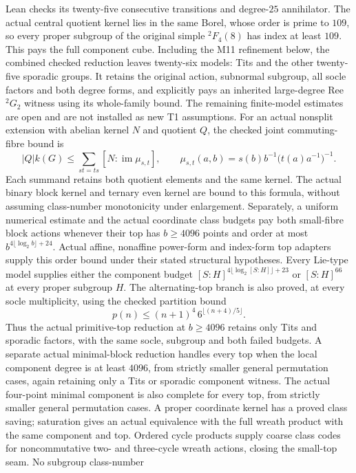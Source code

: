 Lean checks its twenty-five consecutive transitions and degree-$25$
annihilator. The actual central quotient kernel lies in the same Borel,
whose order is prime to $109$, so every proper subgroup of the original
simple ${}^2F_4(8)$ has index at least $109$. This pays the full component
cube. Including the M11 refinement below, the combined checked reduction
leaves twenty-six models: Tits and the other twenty-five sporadic groups.
It retains the original
action, subnormal subgroup, all socle factors and both degree forms,
and explicitly pays an inherited large-degree Ree ${}^2G_2$ witness
using its whole-family bound. The remaining finite-model estimates are
open and are not installed as new T1 assumptions.
For an actual nonsplit extension with abelian kernel $N$ and quotient $Q$,
the checked joint commuting-fibre bound is
\[
 |Q|k(G)\leq\sum_{st=ts}[N:\operatorname{im}\mu_{s,t}],
 \qquad
 \mu_{s,t}(a,b)=s(b)b^{-1}\bigl(t(a)a^{-1}\bigr)^{-1}.
\]
Each summand retains both quotient elements and the same kernel. The
actual binary block kernel and ternary even kernel are bound to this
formula, without assuming class-number monotonicity under enlargement.
Separately, a uniform numerical estimate and the actual coordinate class
budgets pay both small-fibre block actions whenever their top has
$b\geq4096$ points and order at most $b^{4\lfloor\log_2 b\rfloor+24}$.
Actual affine, nonaffine power-form and index-form top adapters supply
this order bound under their stated structural hypotheses. Every Lie-type
model supplies either the component budget
$[S:H]^{4\lfloor\log_2[S:H]\rfloor+23}$ or $[S:H]^{66}$ at every proper
subgroup $H$. The alternating-top branch is also proved, at every
socle multiplicity, using the checked partition bound
\[
 p(n)\leq(n+1)^4\,6^{\lfloor(n+4)/5\rfloor}.
\]
Thus the actual primitive-top reduction at $b\geq4096$ retains only
Tits and sporadic factors, with the same socle, subgroup and both
failed budgets. A separate actual minimal-block reduction handles every
top when the local component degree is at least $4096$, from strictly
smaller general permutation cases, again retaining only a Tits or
sporadic component witness. The actual four-point minimal component
is also complete for every top, from strictly smaller general
permutation cases. A proper coordinate kernel has a proved class
saving; saturation gives an actual equivalence with the full wreath
product with the same component and top. Ordered cycle products supply
coarse class codes for noncommutative two- and three-cycle wreath
actions, closing the small-top seam. No subgroup class-number
